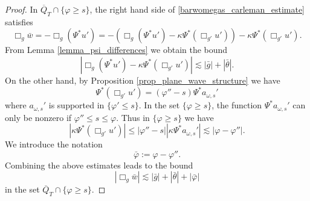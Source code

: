 \documentclass[11pt,letterpaper]{amsart}
\theoremstyle{definition}
\numberwithin{equation}{section}
\newcommand{\ol}[1]{\overline{#1}}
\begin{document}
\begin{proof}
In $\ol{Q}_T \cap \{ \varphi \geq s \}$, the right hand side of \eqref{barwomegas_carleman_estimate} satisfies 
\[
\Box_g \bar{w} = - \Box_g (\Psi^* u') = - (\Box_g (\Psi^* u') - \kappa \Psi^*( \Box_{g'} u')) - \kappa \Psi^* (\Box_{g'} u').
\]
From Lemma \ref{lemma_psi_differences} we obtain the bound 
\[
|\Box_g (\Psi^* u') - \kappa \Psi^* (\Box_{g'} u')| \lesssim |\bar{g}| + |\bar{\theta}|.
\]
On the other hand, by Proposition \ref{prop_plane_wave_structure} we have 
\[
\Psi^* ( \Box_{g'} u') = (\varphi''-s) \Psi^* a_{\omega,s}'
\]
where $a_{\omega,s}'$ is supported in $\{ \varphi' \leq s \}$. In the set $\{ \varphi \geq s \}$, the function $\Psi^* a_{\omega,s}'$  can only be nonzero if $\varphi'' \leq s \leq \varphi$. Thus in $\{ \varphi \geq s \}$ we have 
\[
| \kappa \Psi^* ( \Box_{g'} u')| \leq |\varphi'' - s| | \kappa \Psi^* a_{\omega,s}'| \lesssim |\varphi - \varphi''|.
\]
We introduce the notation 
\[
\bar{\varphi} := \varphi - \varphi''.
\]
Combining the above estimates leads to the bound 
\begin{equation}  \label{boxgbarwomega_estimate}
|\Box_g \bar{w}| \lesssim |\bar{g}| + |\bar{\theta}| + |\bar{\varphi}|
\end{equation}
in the set $\ol{Q}_T \cap \{ \varphi \geq s \}$.


\end{proof}
\end{document}
